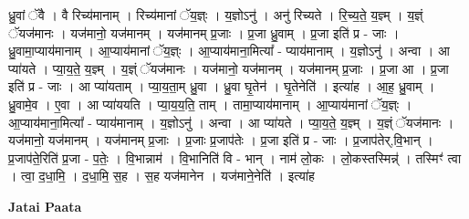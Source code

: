 \documentclass[17pt]{extarticle}
\begin{document}
ध्रु॒वां ॅवै । वै रिच्य॑मानाम् । रिच्य॑मानां ॅय॒ज्ञ्ः । य॒ज्ञोऽनु॑ । अनु॑ रिच्यते । रि॒च्य॒ते॒ य॒ज्ञ्म् । य॒ज्ञ्ं ॅयज॑मानः । यज॑मानो॒ यज॑मानम् । यज॑मानम् प्र॒जाः । प्र॒जा ध्रु॒वाम् । प्र॒जा इति॑ प्र - जाः । ध्रु॒वामा॒प्याय॑मानाम् । आ॒प्याय॑मानां ॅय॒ज्ञ्ः । आ॒प्याय॑माना॒मित्या᳚ - प्याय॑मानाम् । य॒ज्ञोऽनु॑ । अन्वा । आ प्या॑यते । प्या॒य॒ते॒ य॒ज्ञ्म् । य॒ज्ञ्ं ॅयज॑मानः । यज॑मानो॒ यज॑मानम् । यज॑मानम् प्र॒जाः । प्र॒जा आ । प्र॒जा इति॑ प्र - जाः । आ प्या॑यताम् । प्या॒य॒ता॒म् ध्रु॒वा । ध्रु॒वा घृ॒तेन॑ । घृ॒तेनेति॑ । इत्या॑ह । आ॒ह॒ ध्रु॒वाम् । ध्रु॒वामे॒व । ए॒वा । आ प्या॑ययति । प्या॒य॒य॒ति॒ ताम् । तामा॒प्याय॑मानाम् । आ॒प्याय॑मानां ॅय॒ज्ञ्ः । आ॒प्याय॑माना॒मित्या᳚ - प्याय॑मानाम् । य॒ज्ञोऽनु॑ । अन्वा । आ प्या॑यते । प्या॒य॒ते॒ य॒ज्ञ्म् । य॒ज्ञ्ं ॅयज॑मानः । यज॑मानो॒ यज॑मानम् । यज॑मानम् प्र॒जाः । प्र॒जाः प्र॒जाप॑तेः । प्र॒जा इति॑ प्र - जाः । प्र॒जाप॑तेर्,वि॒भान् । प्र॒जाप॑ते॒रिति॑ प्र॒जा - प॒तेः॒ । वि॒भान्नाम॑ । वि॒भानिति॑ वि - भान् । नाम॑ लो॒कः । लो॒कस्तस्मिन्न्॑ । तस्मिꣳ॑ त्वा । त्वा॒ द॒धा॒मि॒ । द॒धा॒मि॒ स॒ह । स॒ह यज॑मानेन । यज॑माने॒नेति॑ । इत्या॑ह \newline

\textbf{Jatai Paata} \newline
\end{document}
